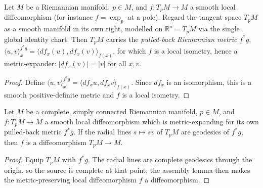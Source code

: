 \begin{lemma}

  \label{lem:dc-ch7-3-4-pullback-metric}


Let $M$ be a Riemannian manifold, $p\in M$, and $f:T_pM\to M$ a smooth local
  diffeomorphism (for instance $f=\exp_p$ at a pole). Regard the tangent space $T_pM$ as
  a smooth manifold in its own right, modelled on $\mathbb R^n=T_pM$ via the single global
  identity chart. Then $T_pM$ carries the \emph{pulled-back Riemannian metric} $f^*g$,
  $\langle u,v\rangle^{f^*g}_x=\langle df_x(u),df_x(v)\rangle_{f(x)}$, for which $f$ is a
  local isometry, hence a metric-expander: $|df_x(v)|=|v|$ for all $x,v$.
\end{lemma}
\begin{proof}


\sketch Define $\langle u,v\rangle^{f^*g}_x=\langle df_xu,df_xv\rangle_{f(x)}$. Since $df_x$ is an isomorphism, this is a smooth positive-definite metric and $f$ is a local isometry.
\end{proof}

\begin{lemma}

  \label{lem:dc-ch7-3-4-pole-diffeo}


Let $M$ be a complete, simply connected Riemannian manifold, $p\in M$, and $f:T_pM\to M$
  a smooth local diffeomorphism which is metric-expanding for its own pulled-back metric
  $f^*g$. If the radial lines $s\mapsto sv$ of $T_pM$ are geodesics of $f^*g$, then $f$ is a
  diffeomorphism $T_pM\to M$.
\end{lemma}
\begin{proof}


\sketch Equip $T_pM$ with $f^*g$. The radial lines are complete geodesics through the origin, so the source is complete at that point; the assembly lemma then makes the metric-preserving local diffeomorphism $f$ a diffeomorphism.
\end{proof}

